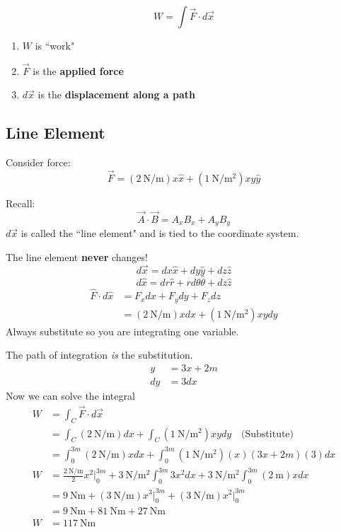 \documentclass{article}
\begin{document}
$$ W = \int \vec{F} \cdot d\vec{x} $$
\begin{enumerate}
	\item $ W $ is ``work"
	\item $ \vec{F} $ is the \textbf{applied force}
	\item $ d\vec{x} $ is the \textbf{displacement along a path}
\end{enumerate}

\subsection{Line Element}

Consider force:
$$ \vec{F} = (\SI{2}{\newton \per \meter})x \hat{x} + (\SI{1}{\newton \per \meter \squared})xy \hat{y} $$

Recall: $$ \vec{A} \cdot \vec{B} = A_xB_x + A_yB_y $$
$ d\vec{x} $ is called the ``line element" and is tied to the coordinate system.

The line element \textbf{never} changes!
$$ d\vec{x} = dx \hat{x} + dy \hat{y} + dz \hat{z} $$
\begin{equation}
	d\hat{x} = dr \hat{r} + rd\theta \hat{\theta} + dz \hat{z}
\end{equation}
\begin{align*}
	\hat{F} \cdot d\hat{x} & = F_xdx + F_ydy + F_zdz \\
						   & = (\SI{2}{\newton \per \meter})xdx + (\SI{1}{\newton \per \meter \squared})xydy
\end{align*}
Always substitute so you are integrating one variable.

The path of integration \textit{is} the substitution.
\begin{align*}
	y & = 3x + 2m \\
	dy & = 3dx
\end{align*}
Now we can solve the integral
\begin{align*}
	W & = \int_C \vec{F} \cdot d\vec{x} \\
	  & = \int_C (\SI{2}{\newton \per \meter})dx + \int_C (\SI{1}{\newton \per \meter \squared})xydy \quad \text{(Substitute)} \\
	  & = \int_0^{3m} (\SI{2}{\newton \per \meter})xdx + \int_0^{3m} (\SI{1}{\newton \per \meter \squared})(x)(3x + 2m)(3)dx \\
	W & = \frac{\SI{2}{\newton \per \meter}}{2}x^2 \biggr\rvert_0^{3m} + \SI{3}{\newton \per \meter \squared} \int_0^{3m} 3x^2 dx + \SI{3}{\newton \per \meter \squared} \int_0^{3m} (\SI{2}{\meter})xdx \\
	  & = \SI{9}{\newton \meter} + (\SI{3}{\newton \per \meter})x^3 \biggr\rvert_0^{3m} + (\SI{3}{\newton \per \meter})x^2 \biggr\rvert_0^{3m} \\
	  & = \SI{9}{\newton \meter} + \SI{81}{\newton \meter} + \SI{27}{\newton \meter} \\
	W & = \SI{117}{\newton \meter}
\end{align*}
\end{document}
